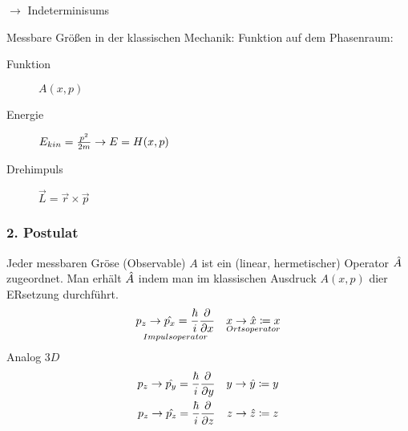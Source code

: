 \begin{bem}
    $\longrightarrow$ Indeterminisums
\end{bem}
    
Messbare Größen in der klassischen Mechanik: Funktion auf dem Phasenraum:
\begin{description}
    \item[Funktion] $A(x,p)$
    \item[Energie] $E_{kin} = \frac{p^2}{2m} \rightarrow E=H(x,p)$
    \item[Drehimpuls] $\vec{L} = \vec{r} \times \vec{p}$
\end{description}

\subsubsection{2. Postulat} %
\label{ssub:2._Postulat}
Jeder messbaren Gröse (Observable) $A$ ist ein (linear, hermetischer) Operator
$\hat{A}$ zugeordnet. Man erhält $\hat{A}$ indem man im klassischen Ausdruck
$A(x,p)$ dier ERsetzung durchführt.
\begin{align*}
    \underset{Impulsoperator}{p_z \rightarrow \hat{p_x} = \frac{\hbar}{i}\frac{\partial}{\partial
    x}} && \underset{Ortsoperator}{x \rightarrow \hat{x} \coloneqq x} \\
\end{align*}
Analog $3D$
\begin{align*}
    p_z \rightarrow \hat{p_y} = \frac{\hbar}{i}\frac{\partial}{\partial y} &&  y \rightarrow \hat{y} \coloneqq y \\
    p_z \rightarrow \hat{p_z} = \frac{\hbar}{i}\frac{\partial}{\partial z} &&  z \rightarrow \hat{z} \coloneqq z 
\end{align*}
